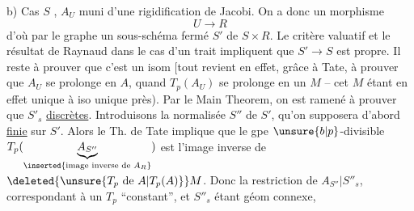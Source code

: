 
b) Cas $S$  , $A_U$ muni d'une rigidification de Jacobi. On a donc un morphisme
\[
U\longrightarrow R
\]
d'où par  le graphe un sous-schéma fermé $S'$ de $S\times R$. Le critère valuatif et le résultat de Raynaud dans le cas d'un trait impliquent que $S'\longrightarrow S$ est propre. Il reste à prouver que c'est un isom [tout revient en effet, grâce à Tate, à prouver que $A_U$ se prolonge en $A$, quand $T_p(A_U)$ se prolonge en un $M$ -- cet $M$ étant en effet unique à iso unique près). Par le Main Theorem, on est ramené à prouver que   $S'_s$  \uline{discrètes}. Introduisons la normalisée $S''$ de $S'$, qu'on supposera d'abord \uline{finie} sur $S'$. Alors le Th. de Tate implique que le gpe $\unsure{b|p}$-divisible $T_p(\underbrace{A_{S''}}_{\inserted{\text{image inverse de }A_R}})$ est l'image inverse de $\deleted{\unsure{T_p\text{ de }A|T_p(A)}}M$. Donc la restriction de $A_{S''}|S''_s$, correspondant à un $T_p$ ``constant'', et $S''_s$ étant géom connexe,

